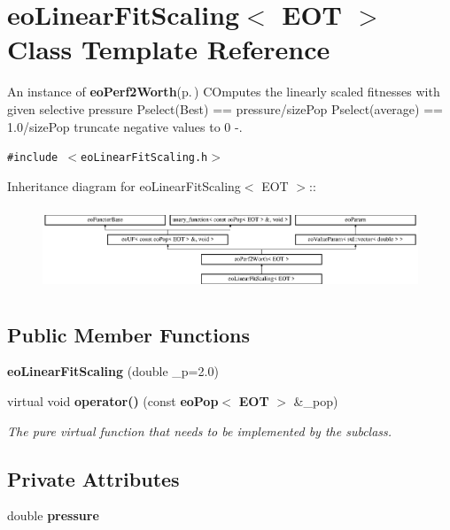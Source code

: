 \section{eo\-Linear\-Fit\-Scaling$<$ EOT $>$ Class Template Reference}
\label{classeo_linear_fit_scaling}
An instance of {\bf eo\-Perf2Worth}{\rm (p.\,\pageref{classeo_perf2_worth})} COmputes the linearly scaled fitnesses with given selective pressure Pselect(Best) == pressure/size\-Pop Pselect(average) == 1.0/size\-Pop truncate negative values to 0 -.  


{\tt \#include $<$eo\-Linear\-Fit\-Scaling.h$>$}

Inheritance diagram for eo\-Linear\-Fit\-Scaling$<$ EOT $>$::\begin{figure}[H]
\begin{center}
\leavevmode
\includegraphics[height=2.52252cm]{classeo_linear_fit_scaling}
\end{center}
\end{figure}
\subsection*{Public Member Functions}
\begin{CompactItemize}
\item 
{\bf eo\-Linear\-Fit\-Scaling} (double \_\-p=2.0)\label{classeo_linear_fit_scaling_a0}

\item 
virtual void {\bf operator()} (const {\bf eo\-Pop}$<$ {\bf EOT} $>$ \&\_\-pop)\label{classeo_linear_fit_scaling_a1}

\begin{CompactList}\small\item\em The pure virtual function that needs to be implemented by the subclass. \item\end{CompactList}\end{CompactItemize}
\subsection*{Private Attributes}
\begin{CompactItemize}
\item 
double {\bf pressure}\label{classeo_linear_fit_scaling_r0}

\end{CompactItemize}


